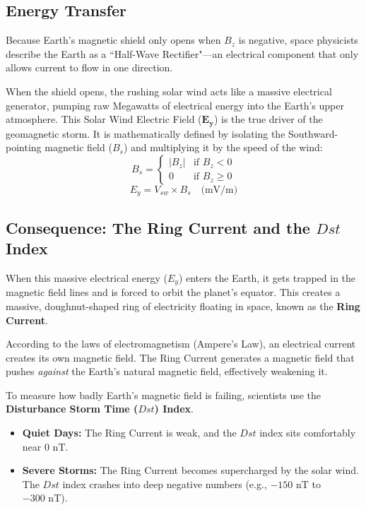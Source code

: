 \documentclass[12pt]{article}
\begin{document}
\subsection{Energy Transfer}
Because Earth's magnetic shield only opens when $B_z$ is negative, space physicists describe the Earth as a ``Half-Wave Rectifier"—an electrical component that only allows current to flow in one direction. 

When the shield opens, the rushing solar wind acts like a massive electrical generator, pumping raw Megawatts of electrical energy into the Earth's upper atmosphere. This Solar Wind Electric Field ($\mathbf{E_y}$) is the true driver of the geomagnetic storm\cite{ref1}. It is mathematically defined by isolating the Southward-pointing magnetic field ($B_s$) and multiplying it by the speed of the wind:
\begin{equation}
B_s = 
\begin{cases} 
      |B_z| & \text{if } B_z < 0 \\
      0 & \text{if } B_z \geq 0 
\end{cases}
\end{equation}
\begin{equation}
E_y = V_{sw} \times B_s \quad \text{(mV/m)}
\end{equation}


\subsection{Consequence: The Ring Current and the $Dst$ Index}
When this massive electrical energy ($E_y$) enters the Earth, it gets trapped in the magnetic field lines and is forced to orbit the planet's equator. This creates a massive, doughnut-shaped ring of electricity floating in space, known as the \textbf{Ring Current}.

According to the laws of electromagnetism (Ampere's Law), an electrical current creates its own magnetic field. The Ring Current generates a magnetic field that pushes \textit{against} the Earth's natural magnetic field, effectively weakening it. 

To measure how badly Earth's magnetic field is failing, scientists use the \textbf{Disturbance Storm Time ($Dst$) Index}. 
\begin{itemize}
    \item \textbf{Quiet Days:} The Ring Current is weak, and the $Dst$ index sits comfortably near $0 \text{ nT}$.
    \item \textbf{Severe Storms:} The Ring Current becomes supercharged by the solar wind. The $Dst$ index crashes into deep negative numbers (e.g., $-150 \text{ nT}$ to $-300 \text{ nT}$).
\end{itemize}
\end{document}

